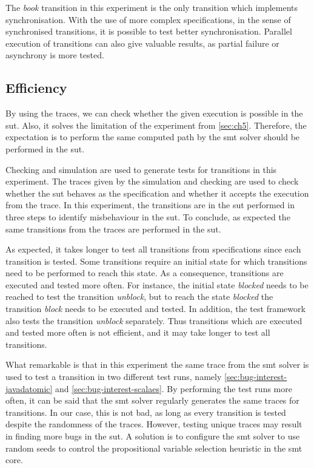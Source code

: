 The \textit{book} transition in this experiment is the only transition which
implements synchronisation. With the use of more complex specifications, in the
sense of synchronised transitions, it is possible to test better
synchronisation. Parallel execution of transitions can also give valuable
results, as partial failure or asynchrony is more tested.

\subsection{Efficiency}

By using the traces, we can check whether the given execution is possible in the
\gls{sut}. Also, it solves the limitation of the experiment from
\autoref{sec:ch5}. Therefore, the expectation is to perform the same computed
path by the \gls{smt} solver should be performed in the \gls{sut}.

Checking and simulation are used to generate tests for transitions in this
experiment. The traces given by the simulation and checking are used to check
whether the \gls{sut} behaves as the specification and whether it accepts the
execution from the trace. In this experiment, the transitions are in the
\gls{sut} performed in three steps to identify misbehaviour in the \gls{sut}.
To conclude, as expected the same transitions from the traces are performed in
the \gls{sut}.

As expected, it takes longer to test all transitions from specifications since
each transition is tested. Some transitions require an initial state for which
transitions need to be performed to reach this state. As a consequence,
transitions are executed and tested more often. For instance, the initial state
\textit{blocked} needs to be reached to test the transition \textit{unblock},
but to reach the state \textit{blocked} the transition \textit{block} needs to
be executed and tested. In addition, the test framework also tests the
transition \textit{unblock} separately. Thus transitions which are executed and
tested more often is not efficient, and it may take longer to test all
transitions.

What remarkable is that in this experiment the same trace from the \gls{smt}
solver is used to test a transition in two different test runs, namely
\autoref{sec:bug-interest-javadatomic} and \autoref{sec:bug-interest-scalaes}.
By performing the test runs more often, it can be said that the \gls{smt} solver
regularly generates the same traces for transitions. In our case, this is not
bad, as long as every transition is tested despite the randomness of the traces.
However, testing unique traces may result in finding more bugs in the
\gls{sut}. A solution is to configure the \gls{smt} solver to use random seeds
to control the propositional variable selection heuristic in the \gls{smt} core.

